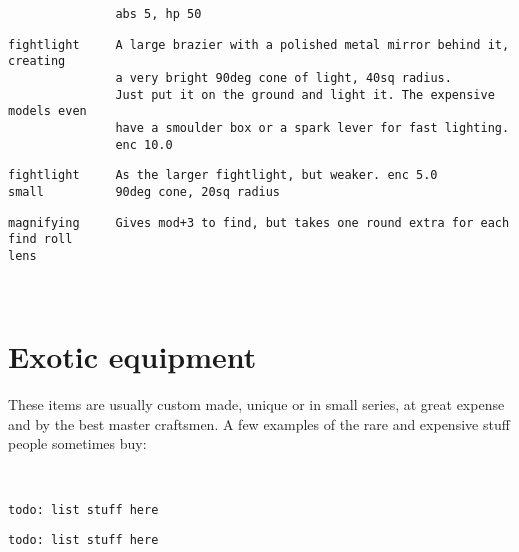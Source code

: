 \begin{samepage}
\begin{verbatim}
               abs 5, hp 50
\end{verbatim} \blocklistgap \begin{verbatim}
fightlight     A large brazier with a polished metal mirror behind it, creating
               a very bright 90deg cone of light, 40sq radius.
               Just put it on the ground and light it. The expensive models even
               have a smoulder box or a spark lever for fast lighting.
               enc 10.0
\end{verbatim} \blocklistgap \begin{verbatim}
fightlight     As the larger fightlight, but weaker. enc 5.0
small          90deg cone, 20sq radius
\end{verbatim} \blocklistgap \begin{verbatim}
magnifying     Gives mod+3 to find, but takes one round extra for each find roll
lens
\end{verbatim} \end{samepage} \normalsize

\












\section*{Exotic equipment}

These items are usually custom made, unique or in small series, at great expense and by the best master craftsmen. A few examples of the rare and expensive stuff people sometimes buy:

\

\small \begin{samepage} \begin{verbatim}
todo: list stuff here
\end{verbatim} \blocklistgap \begin{verbatim}
todo: list stuff here
\end{verbatim} \end{samepage} \normalsize

\









